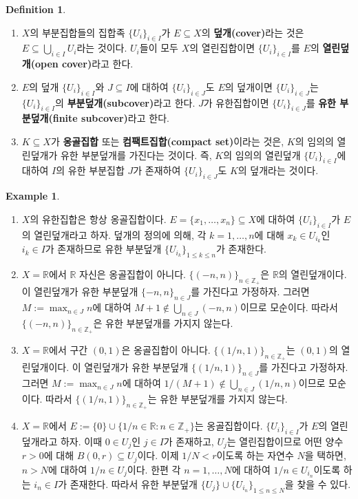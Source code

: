 \documentclass[11pt]{book}
\numberwithin{equation}{chapter}
\def\ZZ{\mathbb{Z}}
\def\RR{\mathbb{R}}
\theoremstyle{definition}
\newtheorem{defn}[thm]{Definition}
\newtheorem*{ex}{Example}
\newenvironment{enum}
	{\begin{enumerate}[label=(\alph*), leftmargin=2\parindent]}
	{\end{enumerate}}
\begin{document}
\begin{defn}
    \quad

    \begin{enum}
        \item \(X\)의 부분집합들의 집합족 \(\{U_i\}_{i \in I}\)가 \(E \subseteq X\)의 \textbf{덮개(cover)}라는 것은 \(E \subseteq \bigcup_{i \in I} U_i\)라는 것이다. \(U_i\)들이 모두 \(X\)의 열린집합이면 \(\{U_i\}_{i \in I}\)를 \(E\)의 \textbf{열린덮개(open cover)}라고 한다.
        \item \(E\)의 덮개 \(\{U_i\}_{i \in I}\)와 \(J \subseteq I\)에 대하여 \(\{U_i\}_{i \in J}\)도 \(E\)의 덮개이면 \(\{U_i\}_{i \in J}\)는 \(\{U_i\}_{i \in I}\)의 \textbf{부분덮개(subcover)}라고 한다. \(J\)가 유한집합이면 \(\{U_i\}_{i \in J}\)를 \textbf{유한 부분덮개(finite subcover)}라고 한다.
        \item \(K \subseteq X\)가 \textbf{옹골집합} 또는 \textbf{컴팩트집합(compact set)}이라는 것은, \(K\)의 임의의 열린덮개가 유한 부분덮개를 가진다는 것이다. 즉, \(K\)의 임의의 열린덮개 \(\{U_i\}_{i \in I}\)에 대하여 \(I\)의 유한 부분집합 \(J\)가 존재하여 \(\{U_i\}_{i \in J}\)도 \(K\)의 덮개라는 것이다.
    \end{enum}
\end{defn}

\begin{ex}
    \quad

    \begin{enum}
        \item \(X\)의 유한집합은 항상 옹골집합이다. \(E = \{x_1, \ldots, x_n\} \subseteq X\)에 대하여 \(\{U_i\}_{i \in I}\)가 \(E\)의 열린덮개라고 하자. 덮개의 정의에 의해, 각 \(k = 1, \ldots, n\)에 대해 \(x_k \in U_{i_k}\)인 \(i_k \in I\)가 존재하므로 유한 부분덮개 \(\{U_{i_k}\}_{1 \le k \le n}\)가 존재한다.
        \item \(X = \RR\)에서 \(\RR\) 자신은 옹골집합이 아니다. \(\{(-n, n)\}_{n \in \ZZ_+}\)은 \(\RR\)의 열린덮개이다. 이 열린덮개가 유한 부분덮개 \(\{-n, n\}_{n \in J}\)를 가진다고 가정하자. 그러면 \(M := \max_{n \in J} n\)에 대하여 \(M+1 \notin \bigcup_{n \in J} (-n, n)\)이므로 모순이다. 따라서 \(\{(-n, n)\}_{n \in \ZZ_+}\)은 유한 부분덮개를 가지지 않는다.
        \item \(X = \RR\)에서 구간 \((0, 1)\)은 옹골집합이 아니다. \(\{(1/n, 1)\}_{n \in \ZZ_+}\)는 \((0, 1)\)의 열린덮개이다. 이 열린덮개가 유한 부분덮개 \(\{(1/n, 1)\}_{n \in J}\)를 가진다고 가정하자. 그러면 \(M := \max_{n \in J} n\)에 대하여 \(1/(M+1) \notin \bigcup_{n \in J} (1/n, n)\)이므로 모순이다. 따라서 \(\{(1/n, 1)\}_{n \in \ZZ_+}\)는 유한 부분덮개를 가지지 않는다.
        \item \(X = \RR\)에서 \(E := \{0\} \cup \{1/n \in \RR : n \in \ZZ_+\}\)는 옹골집합이다. \(\{U_i\}_{i \in I}\)가 \(E\)의 열린덮개라고 하자. 이때 \(0 \in U_j\)인 \(j \in I\)가 존재하고, \(U_j\)는 열린집합이므로 어떤 양수 \(r > 0\)에 대해 \(B(0, r) \subseteq U_j\)이다. 이제 \(1/N < r\)이도록 하는 자연수 \(N\)을 택하면, \(n > N\)에 대하여 \(1/n \in U_j\)이다. 한편 각 \(n = 1, \ldots, N\)에 대하여 \(1/n \in U_{i_n}\)이도록 하는 \(i_n \in I\)가 존재한다. 따라서 유한 부분덮개 \(\{U_j\} \cup \{U_{i_n}\}_{1 \le n \le N}\)을 찾을 수 있다.
    \end{enum}
\end{ex}
\end{document}
